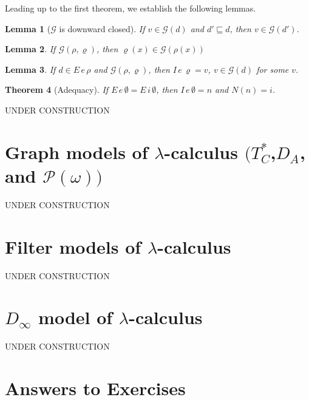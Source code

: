 \documentclass{tufte-handout}
\newtheorem{theorem}{Theorem}%
\newtheorem{lemma}[theorem]{Lemma}
\begin{document}
\noindent Leading up to the first theorem, we establish the following lemmas.

\begin{lemma}[$\mathcal{G}$ is downward closed]
\label{lem:sub-good}
If $v \in \mathcal{G}(d)$ and $d' \sqsubseteq d$, then $v \in \mathcal{G}(d')$.
\end{lemma}

\begin{lemma}
\label{lem:lookup-good}
  If $\mathcal{G}(\rho,\varrho)$,
  then $\varrho(x) \in \mathcal{G}(\rho(x))$
\end{lemma}

\begin{lemma}
  If $d \in E\,e\,\rho$ and $\mathcal{G}(\rho,\varrho)$, then
  $I\,e\,\varrho = v$, $v \in \mathcal{G}(d)$ for some $v$.
\end{lemma}

\begin{theorem}[Adequacy]
If $E\,e\,\emptyset = E\,i\,\emptyset$, then $I\,e\,\emptyset = n$
and $N(n) = i$.
\end{theorem}

UNDER CONSTRUCTION


\section{Graph models of $\lambda$-calculus $(T^{*}_C$,$D_A$, and $\mathcal{P}(\omega))$ }
\label{sec:graph-models}

UNDER CONSTRUCTION

\section{Filter models of $\lambda$-calculus}
\label{sec:filter-models}

UNDER CONSTRUCTION

\section{$D_\infty$ model of $\lambda$-calculus}
\label{sec:D-infinity}

UNDER CONSTRUCTION

\clearpage
\pagebreak

\section*{Answers to Exercises}

\shipoutAnswer

\clearpage
\pagebreak



\end{document}
